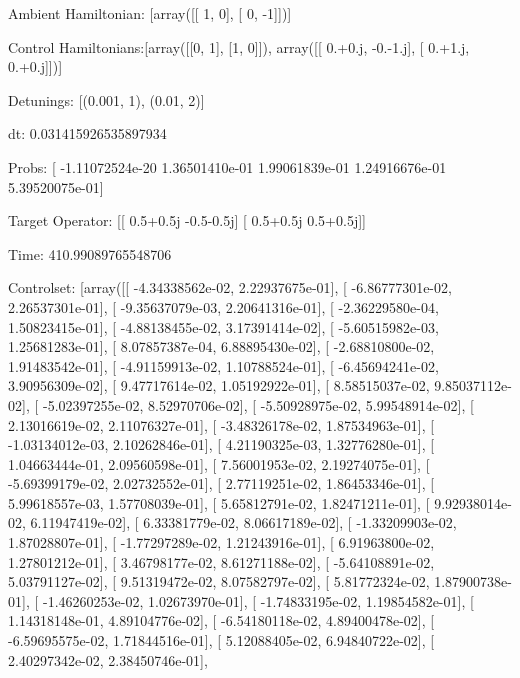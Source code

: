 \documentclass{article}
\begin{document}
    

\newpage

Ambient Hamiltonian: [array([[ 1,  0],
       [ 0, -1]])]

Control Hamiltonians:[array([[0, 1],
       [1, 0]]), array([[ 0.+0.j, -0.-1.j],
       [ 0.+1.j,  0.+0.j]])]

Detunings: [(0.001, 1), (0.01, 2)]

 dt: 0.031415926535897934

Probs: [ -1.11072524e-20   1.36501410e-01   1.99061839e-01   1.24916676e-01
   5.39520075e-01]

Target Operator: [[ 0.5+0.5j -0.5-0.5j]
 [ 0.5+0.5j  0.5+0.5j]]

Time: 410.99089765548706

Controlset: [array([[ -4.34338562e-02,   2.22937675e-01],
       [ -6.86777301e-02,   2.26537301e-01],
       [ -9.35637079e-03,   2.20641316e-01],
       [ -2.36229580e-04,   1.50823415e-01],
       [ -4.88138455e-02,   3.17391414e-02],
       [ -5.60515982e-03,   1.25681283e-01],
       [  8.07857387e-04,   6.88895430e-02],
       [ -2.68810800e-02,   1.91483542e-01],
       [ -4.91159913e-02,   1.10788524e-01],
       [ -6.45694241e-02,   3.90956309e-02],
       [  9.47717614e-02,   1.05192922e-01],
       [  8.58515037e-02,   9.85037112e-02],
       [ -5.02397255e-02,   8.52970706e-02],
       [ -5.50928975e-02,   5.99548914e-02],
       [  2.13016619e-02,   2.11076327e-01],
       [ -3.48326178e-02,   1.87534963e-01],
       [ -1.03134012e-03,   2.10262846e-01],
       [  4.21190325e-03,   1.32776280e-01],
       [  1.04663444e-01,   2.09560598e-01],
       [  7.56001953e-02,   2.19274075e-01],
       [ -5.69399179e-02,   2.02732552e-01],
       [  2.77119251e-02,   1.86453346e-01],
       [  5.99618557e-03,   1.57708039e-01],
       [  5.65812791e-02,   1.82471211e-01],
       [  9.92938014e-02,   6.11947419e-02],
       [  6.33381779e-02,   8.06617189e-02],
       [ -1.33209903e-02,   1.87028807e-01],
       [ -1.77297289e-02,   1.21243916e-01],
       [  6.91963800e-02,   1.27801212e-01],
       [  3.46798177e-02,   8.61271188e-02],
       [ -5.64108891e-02,   5.03791127e-02],
       [  9.51319472e-02,   8.07582797e-02],
       [  5.81772324e-02,   1.87900738e-01],
       [ -1.46260253e-02,   1.02673970e-01],
       [ -1.74833195e-02,   1.19854582e-01],
       [  1.14318148e-01,   4.89104776e-02],
       [ -6.54180118e-02,   4.89400478e-02],
       [ -6.59695575e-02,   1.71844516e-01],
       [  5.12088405e-02,   6.94840722e-02],
       [  2.40297342e-02,   2.38450746e-01],
\end{document}
